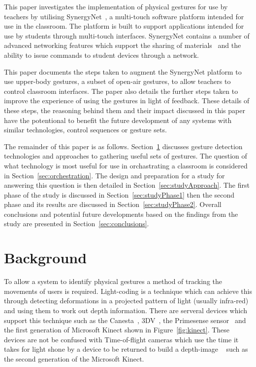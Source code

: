 \documentclass[link]{IWCOMP}
\begin{document}
This paper investigates the implementation of physical gestures for use by teachers by utilising SynergyNet~\cite{HatchA.HigginsSMercier2009}, a multi-touch software platform intended for use in the classroom.
The platform is built to support applications intended for use by students through multi-touch interfaces.
SynergyNet contains a number of advanced networking features which support the sharing of materials~\cite{mcnaughton-et-al:jce2017} and the ability to issue commands to student devices through a network.

This paper documents the steps taken to augment the SynergyNet platform to use upper-body gestures, a subset of open-air gestures, to allow teachers to control classroom interfaces.
The paper also details the further steps taken to improve the experience of using the gestures in light of feedback.
These details of these steps, the reasoning behind them and their impact discussed in this paper have the potentional to benefit the future development of any systems with similar technologies, control sequences or gesture sets.

The remainder of this paper is as follows. 
Section~\ref{sec:background} discusses gesture detection technologies and approaches to gathering useful sets of gestures.
The question of what technology is most useful for use in orchastrating a classroom is considered in Section~\ref{sec:orchestration}.
The design and preparation for a study for answering this question is then detailed in Section~\ref{sec:studyApproach}.
The first phase of the study is discussed in Section~\ref{sec:studyPhase1} then the second phase and its results are discussed in Section~\ref{sec:studyPhase2}.
Overall conclusions and potential future developments based on the findings from the study are presented in Section~\ref{sec:conclusions}.

\section{Background} 
\label{sec:background}


To allow a system to identify physical gestures a method of tracking the movements of users is required.
Light-coding is a technique which can achieve this through detecting deformations in a projected pattern of light (usually infra-red) and using them to work out depth information.
There are serveral devices which support this technique such as the Canesta~\cite{Yang2007}, 3DV~\cite{Wilson2007a}, the Primesense sensor~\cite{Wilson2010} and the first generation of Microsoft Kinect shown in Figure~\ref{fig:kinect}.
These devices are not be confused with Time-of-flight cameras which use the time it takes for light shone by a device to be returned to build a depth-image ~\cite{Lange2001} such as the second generation of the Microsoft Kinect.
\end{document}
